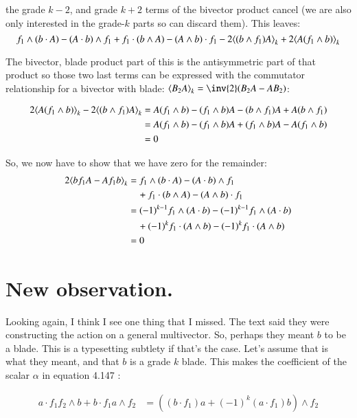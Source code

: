 the grade $k-2$, and grade $k+2$ terms of the bivector product 
cancel (we are also only interested in the grade-$k$ parts so can discard them).  This leaves:
\begin{equation*}
f_1 \wedge (b \cdot A) - (A \cdot b) \wedge f_1
+ f_1 \cdot (b \wedge A) - (A \wedge b) \cdot f_1
- 2 {\left\langle{{(b \wedge f_1) A}}\right\rangle}_{k} 
+ 2 {\left\langle{{A (f_1 \wedge b)}}\right\rangle}_{k}
\end{equation*}

The bivector, blade product part of this is the antisymmetric part of that product so those two last terms can be expressed with the
commutator relationship for a bivector with blade: $\gpgrade{B_2 A}{k} = \inv{2}(B_2 A - A B_2)$:

\begin{align*}
2 {\left\langle{{A (f_1 \wedge b)}}\right\rangle}_{k}
- 2 {\left\langle{{(b \wedge f_1) A}}\right\rangle}_{k} 
&= A (f_1 \wedge b) - (f_1 \wedge b) A - (b \wedge f_1) A + A (b \wedge f_1) \\
&= A (f_1 \wedge b) - (f_1 \wedge b) A + (f_1 \wedge b) A - A (f_1 \wedge b) \\
&= 0
\end{align*}

So, we now have to show that we have zero for the remainder:
\begin{align*}
2 {\left\langle{{ b f_1 A - A f_1 b}}\right\rangle}_{k} 
&= f_1 \wedge (b \cdot A) - (A \cdot b) \wedge f_1 \\
&\quad + f_1 \cdot (b \wedge A) - (A \wedge b) \cdot f_1 \\
&= (-1)^{k-1}f_1 \wedge (A \cdot b) - (-1)^{k-1}f_1 \wedge (A \cdot b) \\
&\quad + (-1)^{k}f_1 \cdot (A \wedge b) - (-1)^{k} f_1 \cdot (A \wedge b) \\
&= 0
\end{align*}

\section{New observation. }

Looking again, I think I see one thing that I missed.  The text said they were 
constructing the action on a general multivector.  So, perhaps they meant
$b$ to be a blade.  This is a typesetting subtlety if that's the case.  Let's
assume that is what they meant, and that $b$ is a grade $k$ blade.  This 
makes the coefficient of the scalar $\alpha$ in equation 4.147 :

\begin{align*}
a \cdot f_1 f_2 \wedge b + b \cdot f_1 a \wedge f_2
&= \left( (b \cdot f_1) a + (-1)^{k} (a \cdot f_1) b \right) \wedge f_2 \\
\end{align*}

